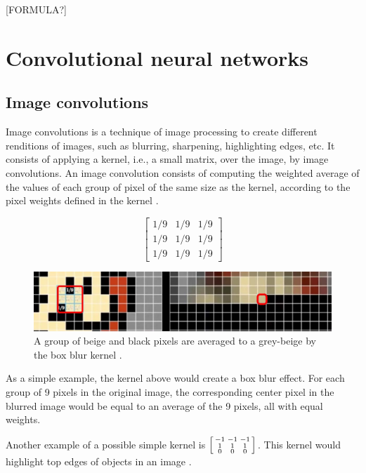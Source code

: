 \documentclass[12pt,a4paper,notitlepage]{article}
\begin{document}
[FORMULA?]

\section{Convolutional neural networks}

\subsection{Image convolutions}
Image convolutions is a technique of image processing to create different renditions of images, such as blurring, sharpening, highlighting edges, etc. It consists of applying a kernel, i.e., a small matrix, over the image, by image convolutions. An image convolution consists of computing the weighted average of the values of each group of pixel of the same size as the kernel, according to the pixel weights defined in the kernel \cite{sanderson_convolutions_2020}.

\begin{displaymath}
	\begin{bmatrix}
		1/9 & 1/9 & 1/9 \\
		1/9 & 1/9 & 1/9 \\
		1/9 & 1/9 & 1/9
	\end{bmatrix}
\end{displaymath}

\begin{figure}[htbp]
	\centering
		\includegraphics[width=1.00\textwidth]{images/box-blur.jpg}
	\caption{A group of beige and black pixels are averaged to a grey-beige by the box blur kernel \cite{sanderson_convolutions_2020}.}
	\label{fig:box-blur}
\end{figure}

As a simple example, the kernel above would create a box blur effect. For each group of 9 pixels in the original image, the corresponding center pixel in the blurred image would be equal to an average of the 9 pixels, all with equal weights.

Another example of a possible simple kernel is \(\begin{bsmallmatrix}-1 & -1 & -1 \\ 1 & 1 & 1 \\ 0 & 0 & 0\end{bsmallmatrix}\). This kernel would highlight top edges of objects in an image \cite{deep_lizard_convolutional_2017}.
\end{document}
